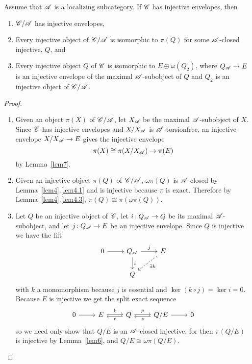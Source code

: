 \documentclass[dissertation.tex]{subfiles}
\begin{document}
\begin{prop}\label{prop1}
  Assume that $\mathscr{A}$ is a localizing subcategory.
  If $\mathscr{C}$ has injective envelopes, then
  \begin{enumerate}
  \item
    $\mathscr{C}/\mathscr{A}$ has injective envelopes,
  \item
    Every injective object of $\mathscr{C}/\mathscr{A}$ is isomorphic to $\pi(Q)$ for some $\mathscr{A}$-closed injective, $Q$, and
  \item
    Every injective object $Q$ of $\mathscr{C}$ is isomorphic to $E \oplus \omega(Q_2)$, where $Q_{\mathscr{A}} \rightarrow E$ is an injective envelope of the maximal $\mathscr{A}$-subobject of $Q$ and $Q_2$ is an injective object of $\mathscr{C}/\mathscr{A}$.
  \end{enumerate}
  
  \begin{proof}
    \begin{enumerate}
    \item
      Given an object $\pi(X)$ of $\mathscr{C}/\mathscr{A}$, let $X_{\mathscr{A}}$ be the maximal $\mathscr{A}$-subobject of $X$.
      Since $\mathscr{C}$ has injective envelopes and $X/X_{\mathscr{A}}$ is $\mathscr{A}$-torsionfree, an injective envelope $X/X_{\mathscr{A}} \rightarrow E$ gives the injective envelope
      $$\pi(X) \cong \pi(X/X_{\mathscr{A}}) \rightarrow \pi(E)$$
      by Lemma~\ref{lem7}.
    \item
      Given an injective object $\pi(Q)$ of $\mathscr{C}/\mathscr{A}$, $\omega\pi(Q)$ is $\mathscr{A}$-closed by Lemma~\ref{lem4}.\ref{lem4.1} and is injective because $\pi$ is exact.
      Therefore by Lemma~\ref{lem4}.\ref{lem4.3}, $\pi(Q) \cong \pi(\omega\pi(Q))$.
    \item
      Let $Q$ be an injective object of $\mathscr{C}$, let $i \colon Q_{\mathscr{A}} \rightarrow Q$ be its maximal $\mathscr{A}$-subobject, and let $j \colon Q_{\mathscr{A}} \rightarrow E$ be an injective envelope.
      Since $Q$ is injective we have the lift
      $$\begin{tikzcd}
        0 \arrow{r} & Q_\A \arrow{r}{j} \arrow{d}{i}& E \arrow[dashed]{ld}{\exists k}\\
        & Q
      \end{tikzcd}$$
      with $k$ a monomorphism because $j$ is essential and $\ker{(k \circ j)} = \ker{i} = 0$.
      Because $E$ is injective we get the split exact sequence
      $$\begin{tikzcd}
        0 \arrow{r} & E \arrow[shift left=0.5]{r}{k} & Q \arrow[shift left=0.5]{r}{p}\arrow[shift left=0.5ex]{l}{r} & Q/E \arrow[shift left=0.5ex]{l}{s} \arrow{r} & 0
      \end{tikzcd}$$
      so we need only show that $Q/E$ is an $\mathscr{A}$-closed injective, for then $\pi(Q/E)$ is injective by Lemma~\ref{lem6}, and $Q/E \cong \omega\pi(Q/E)$. 
      

\end{enumerate}
\end{proof}
\end{prop}
\end{document}
